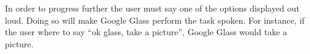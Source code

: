 In order to progress further the user must say one of the options displayed out loud. Doing so will make Google Glass perform the task spoken. For instance, if the user where to say ``ok glass, take a picture'', Google Glass would take a picture.




